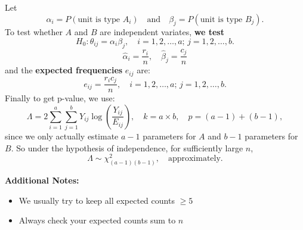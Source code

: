 \documentclass[a4paper,12pt]{article}
\begin{document}
Let
\[
\alpha_i = P(\text{unit is type } A_i) \quad \text{and} \quad \beta_j = P(\text{unit is type } B_j).
\]
To test whether \( A \) and \( B \) are independent variates, \textbf{we test}
\[
H_0 : \theta_{ij} = \alpha_i \beta_j, \quad i = 1, 2, \dots, a; \, j = 1, 2, \dots, b.
\]
\[
\hat{\alpha}_i = \frac{r_i}{n}, \quad \hat{\beta}_j = \frac{c_j}{n}
\]
and the \textbf{expected frequencies} \( e_{ij} \) are:
\[
e_{ij} = \frac{r_i c_j}{n}, \quad i = 1, 2, \dots, a; \, j = 1, 2, \dots, b.
\]
Finally to get p-value, we use:
\[
\Lambda = 2 \sum_{i=1}^{a} \sum_{j=1}^{b} Y_{ij} \log \left( \frac{Y_{ij}}{E_{ij}} \right), \quad k = a \times b, \quad  p = (a - 1) + (b - 1),
\]
since we only actually estimate \( a - 1 \) parameters for \( A \) and \( b - 1 \) parameters for \( B \).
So under the hypothesis of independence, for sufficiently large \( n \),
\[
\Lambda \sim \chi^2_{(a-1)(b-1)}, \quad \text{approximately}.
\]


\textbf{Additional Notes:}
\begin{itemize}
    \item We usually try to keep all expected counts \(\geq 5\)
    \item Always check your expected counts sum to \(n\)
\end{itemize}
\end{document}
